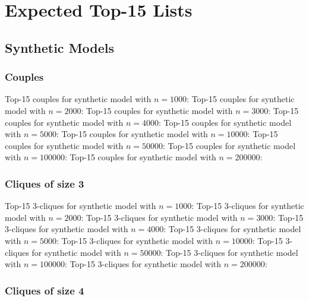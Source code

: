 \documentclass[a4paper,11pt]{article}
\newcommand{\qr}[3]{\noindent{}Top-15 #2 for #3:{\scriptsize}}
\begin{document}
\newpage
\section{Expected Top-15 Lists}
\label{sec:top-15}

\subsection{Synthetic Models}
\label{sec:top-15:synthetic-models}

\subsubsection{Couples}

\qr{synth-1000.query.couples}{couples}{synthetic model with \(n=1000\)}
\qr{synth-2000.query.couples}{couples}{synthetic model with \(n=2000\)}
\qr{synth-3000.query.couples}{couples}{synthetic model with \(n=3000\)}
\qr{synth-4000.query.couples}{couples}{synthetic model with \(n=4000\)}
\qr{synth-5000.query.couples}{couples}{synthetic model with \(n=5000\)}
\qr{synth-10000.query.couples}{couples}{synthetic model with \(n=10000\)}
\qr{synth-50000.query.couples}{couples}{synthetic model with \(n=50000\)}
\qr{synth-100000.query.couples}{couples}{synthetic model with \(n=100000\)}
\qr{synth-200000.query.couples}{couples}{synthetic model with \(n=200000\)}

\newpage
\subsubsection{Cliques of size 3}

\qr{synth-1000.query.3cliques}{3-cliques}{synthetic model with \(n=1000\)}
\qr{synth-2000.query.3cliques}{3-cliques}{synthetic model with \(n=2000\)}
\qr{synth-3000.query.3cliques}{3-cliques}{synthetic model with \(n=3000\)}
\qr{synth-4000.query.3cliques}{3-cliques}{synthetic model with \(n=4000\)}
\qr{synth-5000.query.3cliques}{3-cliques}{synthetic model with \(n=5000\)}
\qr{synth-10000.query.3cliques}{3-cliques}{synthetic model with \(n=10000\)}
\qr{synth-50000.query.3cliques}{3-cliques}{synthetic model with \(n=50000\)}
\qr{synth-100000.query.3cliques}{3-cliques}{synthetic model with \(n=100000\)}
\qr{synth-200000.query.3cliques}{3-cliques}{synthetic model with \(n=200000\)}

\newpage
\subsubsection{Cliques of size 4}
\end{document}
